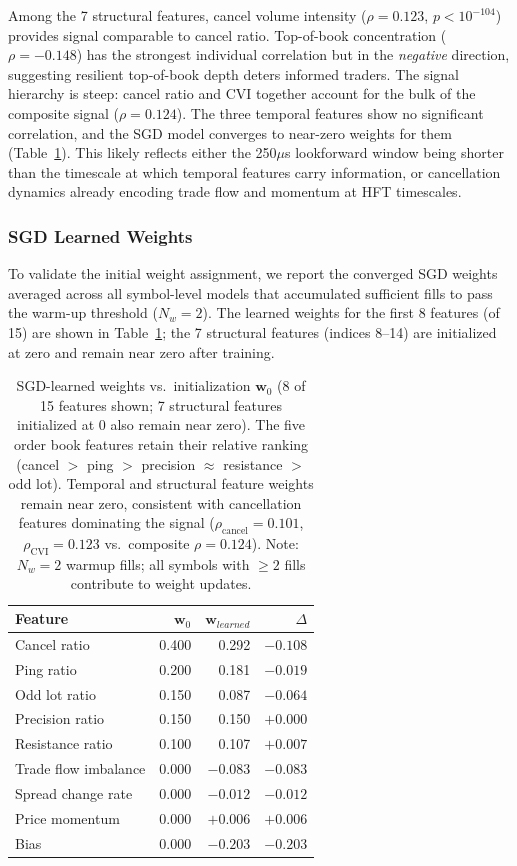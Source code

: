\documentclass[11pt]{article}
\theoremstyle{definition}
\begin{document}
Among the 7 structural features, cancel volume intensity ($\rho = 0.123$, $p < 10^{-104}$) provides signal comparable to cancel ratio. Top-of-book concentration ($\rho = -0.148$) has the strongest individual correlation but in the \emph{negative} direction, suggesting resilient top-of-book depth deters informed traders. The signal hierarchy is steep: cancel ratio and CVI together account for the bulk of the composite signal ($\rho = 0.124$). The three temporal features show no significant correlation, and the SGD model converges to near-zero weights for them (Table~\ref{tab:learned_weights}). This likely reflects either the 250$\mu$s lookforward window being shorter than the timescale at which temporal features carry information, or cancellation dynamics already encoding trade flow and momentum at HFT timescales.

\subsubsection{SGD Learned Weights}
\label{sec:learned_weights}

To validate the initial weight assignment, we report the converged SGD weights averaged across all symbol-level models that accumulated sufficient fills to pass the warm-up threshold ($N_w = 2$). The learned weights for the first 8 features (of 15) are shown in Table~\ref{tab:learned_weights}; the 7 structural features (indices 8--14) are initialized at zero and remain near zero after training.

\begin{table}[H]
\centering
\begin{tabular}{lrrr}
\toprule
\textbf{Feature} & $\mathbf{w}_0$ & $\mathbf{w}_{learned}$ & $\Delta$ \\
\midrule
Cancel ratio & 0.400 & 0.292 & $-0.108$ \\
Ping ratio & 0.200 & 0.181 & $-0.019$ \\
Odd lot ratio & 0.150 & 0.087 & $-0.064$ \\
Precision ratio & 0.150 & 0.150 & $+0.000$ \\
Resistance ratio & 0.100 & 0.107 & $+0.007$ \\
\midrule
Trade flow imbalance & 0.000 & $-0.083$ & $-0.083$ \\
Spread change rate & 0.000 & $-0.012$ & $-0.012$ \\
Price momentum & 0.000 & $+0.006$ & $+0.006$ \\
\midrule
Bias & 0.000 & $-0.203$ & $-0.203$ \\
\bottomrule
\end{tabular}
\caption{SGD-learned weights vs.\ initialization $\mathbf{w}_0$ (8 of 15 features shown; 7 structural features initialized at 0 also remain near zero). The five order book features retain their relative ranking (cancel $>$ ping $>$ precision $\approx$ resistance $>$ odd lot). Temporal and structural feature weights remain near zero, consistent with cancellation features dominating the signal ($\rho_{\text{cancel}} = 0.101$, $\rho_{\text{CVI}} = 0.123$ vs.\ composite $\rho = 0.124$). Note: $N_w = 2$ warmup fills; all symbols with $\geq 2$ fills contribute to weight updates.}
\label{tab:learned_weights}
\end{table}
\end{document}
